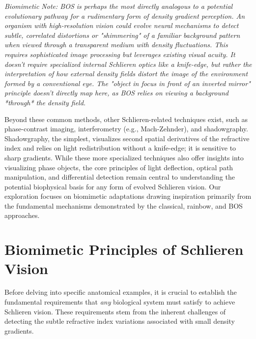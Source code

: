 \documentclass[11pt]{article}
\begin{document}
     \textit{Biomimetic Note: BOS is perhaps the most directly analogous to a potential evolutionary pathway for a rudimentary form of density gradient perception. An organism with high-resolution vision could evolve neural mechanisms to detect subtle, correlated distortions or "shimmering" of a familiar background pattern when viewed through a transparent medium with density fluctuations. This requires sophisticated image processing but leverages existing visual acuity. It doesn't require specialized internal Schlieren optics like a knife-edge, but rather the interpretation of how external density fields distort the image of the environment formed by a conventional eye. The "object in focus in front of an inverted mirror" principle doesn't directly map here, as BOS relies on viewing a background *through* the density field.}

Beyond these common methods, other Schlieren-related techniques exist, such as phase-contrast imaging, interferometry (e.g., Mach-Zehnder), and shadowgraphy. Shadowgraphy, the simplest, visualizes second spatial derivatives of the refractive index and relies on light redistribution without a knife-edge; it is sensitive to sharp gradients. While these more specialized techniques also offer insights into visualizing phase objects, the core principles of light deflection, optical path manipulation, and differential detection remain central to understanding the potential biophysical basis for any form of evolved Schlieren vision. Our exploration focuses on biomimetic adaptations drawing inspiration primarily from the fundamental mechanisms demonstrated by the classical, rainbow, and BOS approaches.

\section{Biomimetic Principles of Schlieren Vision}

Before delving into specific anatomical examples, it is crucial to establish the fundamental requirements that \textit{any} biological system must satisfy to achieve Schlieren vision. These requirements stem from the inherent challenges of detecting the subtle refractive index variations associated with small density gradients.
\end{document}
